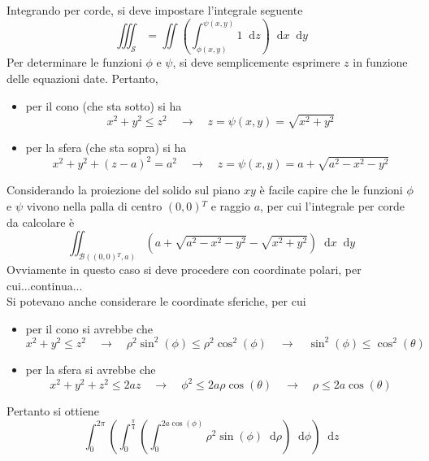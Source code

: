 \documentclass[a4paper]{extarticle}
\newcommand*\dif{\mathop{}\!\mathrm{d}}
\begin{document}
\vspace{2em}
\noindent
Integrando per corde, si deve impostare l'integrale seguente
\[\iiint_\mathcal{S} = \iint \left(\int_{\phi(x,y)}^{\psi(x,y)} 1 \dif z\right) \dif x \dif y\]
Per determinare le funzioni $\phi$ e $\psi$, si deve semplicemente esprimere $z$ in funzione delle equazioni date. Pertanto,
\begin{itemize}
    \item per il cono (che sta sotto) si ha
    \[x^2+y^2 \leq z^2 \hspace{1em} \rightarrow \hspace{1em} z = \psi(x,y) = \sqrt{x^2+y^2}\]
    \item per la sfera (che sta sopra) si ha
    \[x^2+y^2+(z-a)^2=a^2 \hspace{1em} \rightarrow \hspace{1em} z=\psi(x,y) = a+\sqrt{a^2-x^2-y^2}\]
\end{itemize}
Considerando la proiezione del solido sul piano $xy$ è facile capire che le funzioni $\phi$ e $\psi$ vivono nella palla di centro $(0,0){^T}$ e raggio $a$, per cui l'integrale per corde da calcolare è
\[\iint_{\mathcal{B}((0,0){^T},a)} \left(a+\sqrt{a^2-x^2-y^2} - \sqrt{x^2+y^2} \right) \dif x \dif y\]
Ovviamente in questo caso si deve procedere con coordinate polari, per cui...continua...\\
Si potevano anche considerare le coordinate sferiche, per cui
\begin{itemize}
    \item per il cono si avrebbe che
    \[x^2+y^2 \leq z^2 \hspace{1em} \rightarrow \hspace{1em} \rho^2 \sin^2(\phi) \leq \rho^2 \cos^2(\phi) \hspace{1em} \rightarrow \hspace{1em} \sin^2(\phi) \leq \cos^2(\theta)\]
    \item per la sfera si avrebbe che
    \[x^2+y^2+z^2 \leq 2 az \hspace{1em} \rightarrow \hspace{1em} \phi^2 \leq 2a \rho \cos(\theta) \hspace{1em} \rightarrow \hspace{1em} \rho \leq 2 a \cos(\theta)\]
\end{itemize}
Pertanto si ottiene 
\[\int_0^{2\pi} \left(\int_0^{\frac{\pi}{4}} \left(\int_0^{2 a \cos(\phi)} \rho^2 \sin(\phi) \dif \rho\right) \dif \phi \right) \dif z\]
\end{document}
